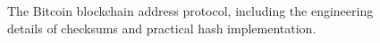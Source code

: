 \begin{figure}[t]
\begin{algorithm}[H]
    \caption{\label{alg.bitcoin-real} The Bitcoin blockchain address protocol, including the engineering details of checksums and practical hash implementation.}
    \begin{algorithmic}[1]
        \Function{$\GenAddress$}{\-}
            \Let{\checksum}{\SHA(\SHA(\addr))[4 * 8]}
            \State\Return{\baseencode($\addr \conc \checksum$)}
        \EndFunction
        \vskip8pt
    \end{algorithmic}
\end{algorithm}
\end{figure}
